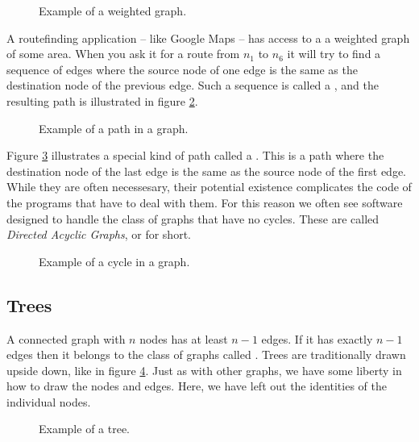 \begin{figure}[tbp]
  
  \caption{Example of a weighted graph.}
  \label{fig:bs:graphs:weighted}
\end{figure}

A routefinding application -- like Google Maps -- has access to a a weighted graph of some area. When you ask it for a route from $n_1$ to $n_6$ it will try to find a sequence of edges where the source node of one edge is the same as the destination node of the previous edge. Such a sequence is called a , and the resulting path is illustrated in figure \ref{fig:bs:graphs:path}.

\begin{figure}[tbp]
  
  \caption{Example of a path in a graph.}
  \label{fig:bs:graphs:path}
\end{figure}

Figure \ref{fig:bs:graphs:cycle} illustrates a special kind of path called a . This is a path where the destination node of the last edge is the same as the source node of the first edge. While they are often necessesary, their potential existence complicates the code of the programs that have to deal with them. For this reason we often see software designed to handle the class of graphs that have no cycles. These are called \textsl{Directed Acyclic Graphs}, or  for short.

\begin{figure}[tbp]
  
  \caption{Example of a cycle in a graph.}
  \label{fig:bs:graphs:cycle}
\end{figure}


\subsection{Trees}

A connected graph with $n$ nodes has at least $n-1$ edges. If it has exactly $n-1$ edges then it belongs to the class of graphs called . Trees are traditionally drawn upside down, like in figure \ref{fig:bs:graphs:trees}. Just as with other graphs, we have some liberty in how to draw the nodes and edges. Here, we have left out the identities of the individual nodes.

\begin{figure}[tbp]
  
  \caption{Example of a tree.}
  \label{fig:bs:graphs:trees}
\end{figure}

